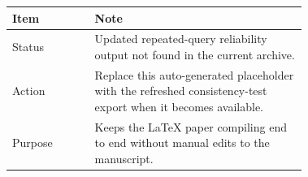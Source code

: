 \begin{tabular}{lp{0.72\linewidth}}
\toprule
Item & Note \\
\midrule
Status & Updated repeated-query reliability output not found in the current archive. \\
Action & Replace this auto-generated placeholder with the refreshed consistency-test export when it becomes available. \\
Purpose & Keeps the LaTeX paper compiling end to end without manual edits to the manuscript. \\
\bottomrule
\end{tabular}